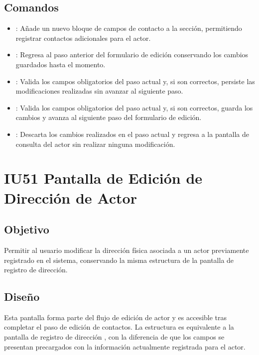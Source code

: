 \subsection{Comandos}
\begin{itemize}
	\item {}: Añade un nuevo bloque de campos de 
	contacto a la sección, permitiendo registrar contactos adicionales para el 
	actor.
	\item {}: Regresa al paso anterior del formulario de 
	edición conservando los cambios guardados hasta el momento.
	\item {}: Valida los campos obligatorios del paso 
	actual y, si son correctos, persiste las modificaciones realizadas sin 
	avanzar al siguiente paso.
	\item {}: Valida los campos obligatorios del paso actual 
	y, si son correctos, guarda los cambios y avanza al siguiente paso del 
	formulario de edición.
	\item {}: Descarta los cambios realizados en el paso actual 
	y regresa a la pantalla de consulta del actor  sin realizar ninguna modificación.
\end{itemize}


\section{IU51 Pantalla de Edición de Dirección de Actor}
\subsection{Objetivo}
Permitir al usuario modificar la dirección física asociada a un actor 
previamente registrado en el sistema, conservando la misma estructura de la 
pantalla de registro de dirección.

\subsection{Diseño}
Esta pantalla  forma 
parte del flujo de edición de actor y es accesible tras completar el paso de 
edición de contactos. La estructura es equivalente a la pantalla de registro 
de dirección , con la 
diferencia de que los campos se presentan precargados con la información 
actualmente registrada para el actor.

